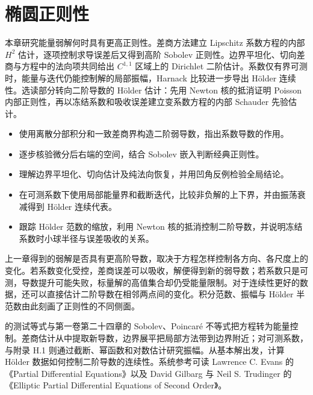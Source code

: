 \chapter{椭圆正则性}
\label{b2:ch:16}
\begin{chapterabstract}
本章研究能量弱解何时具有更高正则性。差商方法建立 Lipschitz 系数方程的内部 \(H^2\) 估计，逐项控制求导误差后又得到高阶 Sobolev 正则性。边界平坦化、切向差商与方程中的法向项共同给出 \(C^{1,1}\) 区域上的 Dirichlet 二阶估计。系数仅有界可测时，能量与迭代仍能控制解的局部振幅，Harnack 比较进一步导出 Hölder 连续性。选读部分转向二阶导数的 Hölder 估计：先用 Newton 核的抵消证明 Poisson 内部正则性，再以冻结系数和吸收误差建立变系数方程的内部 Schauder 先验估计。
\end{chapterabstract}

\begin{learninggoals}
\begin{itemize}
\item\label{b2:item:16-goal-difference}使用离散分部积分和一致差商界构造二阶弱导数，指出系数导数的作用。
\item\label{b2:item:16-goal-bootstrap}逐步核验微分后右端的空间，结合 Sobolev 嵌入判断经典正则性。
\item\label{b2:item:16-goal-boundary}理解边界平坦化、切向估计及纯法向恢复，并用凹角反例检验全局结论。
\item\label{b2:item:16-goal-low}在可测系数下使用局部能量界和截断迭代，比较非负解的上下界，并由振荡衰减得到 Hölder 连续代表。
\item\label{b2:item:16-goal-schauder}跟踪 Hölder 范数的缩放，利用 Newton 核的抵消控制二阶导数，并说明冻结系数时小球半径与误差吸收的关系。
\end{itemize}
\end{learninggoals}

上一章得到的弱解是否具有更高阶导数，取决于方程怎样控制各方向、各尺度上的变化。若系数变化受控，差商误差可以吸收，解便得到新的弱导数；若系数只是可测，导数提升可能失败，标量解的高值集合却仍受能量限制。对于连续性更好的数据，还可以直接估计二阶导数在相邻两点间的变化。积分范数、振幅与 Hölder 半范数由此刻画了正则性的不同侧面。

\ProseParagraphBreak

的测试等式与第一卷第二十四章的 Sobolev、Poincaré 不等式把方程转为能量控制。差商估计从中提取新导数，边界展平把局部方法带到边界附近；对可测系数，与附录 H.1 则通过截断、幂函数和对数估计研究振幅。从基本解出发，计算 Hölder 数据如何控制二阶导数的连续性。系统参考可读 Lawrence C. Evans 的《Partial Differential Equations》\cite{Evans2010Partial}以及 David Gilbarg 与 Neil S. Trudinger 的《Elliptic Partial Differential Equations of Second Order》\cite{Gilbarg2001Elliptic}。

